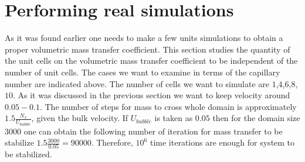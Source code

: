 \documentclass{article}
\begin{document}
\section{Performing real simulations}
As it was found earlier one needs to make a few units simulations to obtain a proper volumetric
mass transfer coefficient. This section studies the quantity of the unit cells on the volumetric
mass transfer coefficient to be independent of the number of unit cells. The cases we want to
examine in terms of the capillary number are indicated above. The number of cells we want to
simulate are $1$,$4$,$6$,$8$,$10$. As it was discussed in the previous section we want to keep
velocity around $0.05-0.1$. The number of steps for mass to cross whole domain is approximately
$1.5 \frac{N_x}{U_{bubble}}$, given the bulk velocity. If $U_{bubble}$ is taken as $0.05$ then for
the domain size $3000$ one can obtain the following number of iteration for mass transfer to be
stabilize $1.5 \frac{3000}{0.05}=90000$. Therefore, $10^{6}$ time iterations are enough for system
to be stabilized.




\end{document}
